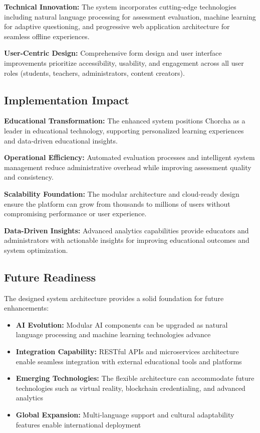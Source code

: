 \documentclass[12pt,a4paper,oneside]{book}
\begin{document}
\textbf{Technical Innovation:} The system incorporates cutting-edge technologies including natural language processing for assessment evaluation, machine learning for adaptive questioning, and progressive web application architecture for seamless offline experiences.

\textbf{User-Centric Design:} Comprehensive form design and user interface improvements prioritize accessibility, usability, and engagement across all user roles (students, teachers, administrators, content creators).

\subsection{Implementation Impact}

\textbf{Educational Transformation:} The enhanced system positions Chorcha as a leader in educational technology, supporting personalized learning experiences and data-driven educational insights.

\textbf{Operational Efficiency:} Automated evaluation processes and intelligent system management reduce administrative overhead while improving assessment quality and consistency.

\textbf{Scalability Foundation:} The modular architecture and cloud-ready design ensure the platform can grow from thousands to millions of users without compromising performance or user experience.

\textbf{Data-Driven Insights:} Advanced analytics capabilities provide educators and administrators with actionable insights for improving educational outcomes and system optimization.

\subsection{Future Readiness}

The designed system architecture provides a solid foundation for future enhancements:

\begin{itemize}
    \item \textbf{AI Evolution:} Modular AI components can be upgraded as natural language processing and machine learning technologies advance
    \item \textbf{Integration Capability:} RESTful APIs and microservices architecture enable seamless integration with external educational tools and platforms
    \item \textbf{Emerging Technologies:} The flexible architecture can accommodate future technologies such as virtual reality, blockchain credentialing, and advanced analytics
    \item \textbf{Global Expansion:} Multi-language support and cultural adaptability features enable international deployment
\end{itemize}
\end{document}
